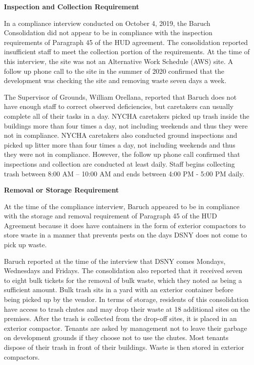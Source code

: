 
\textbf{Inspection and Collection Requirement}

In a compliance interview conducted on October 4, 2019, the Baruch Consolidation did not appear to be in compliance with the inspection requirements of Paragraph 45 of the HUD agreement. The consolidation reported insufficient staff to meet the collection portion of the requirements. At the time of this interview, the site was not an Alternative Work Schedule (AWS) site.  A follow up phone call to the site in the summer of 2020 confirmed that the development was checking the site and removing waste seven days a week.

The Supervisor of Grounds, William Orellana, reported that Baruch does not have enough staff to correct observed deficiencies, but caretakers can usually complete all of their tasks in a day. NYCHA caretakers picked up trash inside the buildings more than four times a day, not including weekends and thus they were not in compliance. NYCHA caretakers also conducted ground inspections and picked up litter more than four times a day, not including weekends and thus they were not in compliance. However, the follow up phone call confirmed that inspections and collection are conducted at least daily. Staff begins collecting trash between 8:00 AM -- 10:00 AM and ends between 4:00 PM - 5:00 PM daily. 

\textbf{Removal or Storage Requirement}

At the time of the compliance interview, Baruch appeared to be in compliance with the storage and removal requirement of Paragraph 45 of the HUD Agreement because it does have containers in the form of exterior compactors to store waste in a manner that prevents pests on the days DSNY does not come to pick up waste. 

Baruch reported at the time of the interview that DSNY comes Mondays, Wednesdays and Fridays. The consolidation also reported that it received seven to eight bulk tickets for the removal of bulk waste, which they noted as being a sufficient amount. Bulk trash sits in a yard with an exterior container before being picked up by the vendor. In terms of storage, residents of this consolidation have access to trash chutes and may drop their waste at 18 additional sites on the premises.  After the trash is collected from the drop-off sites, it is placed in an exterior compactor. Tenants are asked by management not to leave their garbage on development grounds if they choose not to use the chutes. Most tenants dispose of their trash in front of their buildings. Waste is then stored in exterior compactors. 


